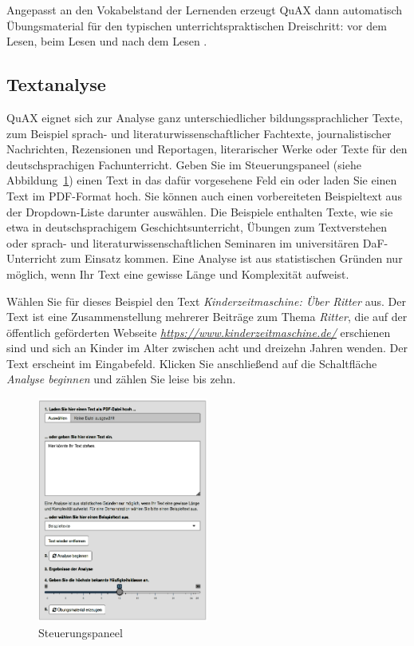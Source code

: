 \documentclass[11pt]{article}\usepackage[]{graphicx}\usepackage[]{color}
\begin{document}
Angepasst an den Vokabelstand der Lernenden erzeugt QuAX dann automatisch Übungsmaterial für den typischen unterrichtspraktischen Dreischritt: vor dem Lesen, beim Lesen und nach dem Lesen \parencite[20]{Watkins.2017}. 

\subsection{Textanalyse}

QuAX eignet sich zur Analyse ganz unterschiedlicher bildungssprachlicher Texte, zum Beispiel sprach- und literaturwissenschaftlicher Fachtexte, journalistischer Nachrichten, Rezensionen und Reportagen, literarischer Werke oder Texte für den deutschsprachigen Fachunterricht. Geben Sie im Steuerungspaneel (siehe Abbildung~\ref{figure:QuAX_side}) einen Text in das dafür vorgesehene Feld ein oder laden Sie einen Text im PDF-Format hoch. Sie können auch einen vorbereiteten Beispieltext aus der Dropdown-Liste darunter auswählen. Die Beispiele enthalten Texte, wie sie etwa in deutschsprachigem Geschichtsunterricht, Übungen zum Textverstehen oder sprach- und literaturwissenschaftlichen Seminaren im universitären DaF-Unterricht zum Einsatz kommen. Eine Analyse ist aus statistischen Gründen nur möglich, wenn Ihr Text eine gewisse Länge und Komplexität aufweist. 

Wählen Sie für dieses Beispiel den Text \textit{Kinderzeitmaschine: Über Ritter} aus. Der Text ist eine Zusammenstellung mehrerer Beiträge zum Thema \textit{Ritter}, die auf der öffentlich geförderten Webseite \textit{\url{https://www.kinderzeitmaschine.de/}} erschienen sind und sich an Kinder im Alter zwischen acht und dreizehn Jahren wenden. Der Text erscheint im Eingabefeld. Klicken Sie anschließend auf die Schaltfläche \textit{Analyse beginnen} und zählen Sie leise bis zehn.

\begin{figure}
\includegraphics[width=0.5\textwidth]{QuAX_side.png}
\caption{Steuerungspaneel}
\label{figure:QuAX_side}
\end{figure}
\end{document}
